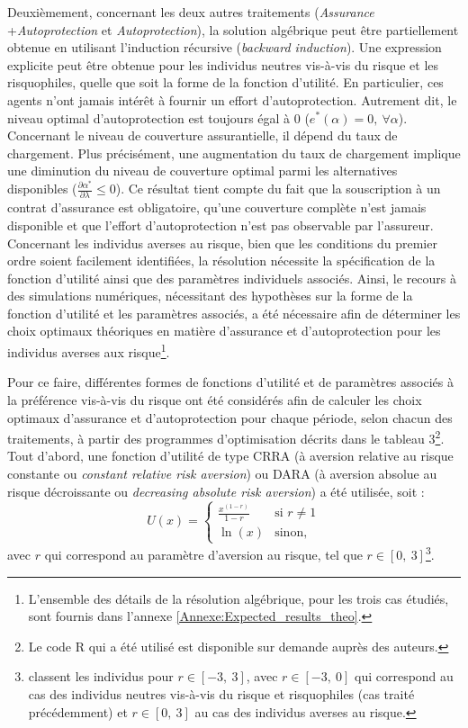 \begin{Article}
\begin{refsection}[Mouminoux]
Deuxièmement, concernant les deux autres traitements (\textit{Assurance} +\linebreak \textit{Autoprotection} et \textit{Autoprotection}), la solution algébrique peut être partiellement obtenue en utilisant l'induction récursive (\textit{backward induction}). Une expression explicite peut être obtenue pour les individus neutres vis-à-vis du risque et les risquophiles, quelle que soit la forme de la fonction d'utilité. En particulier, ces agents n'ont jamais intérêt à fournir un effort d'autoprotection. Autrement dit, le niveau optimal d'autoprotection est toujours égal à 0 ($e^*(\alpha)=0,\ \forall \alpha$). Concernant le niveau de couverture assurantielle, il dépend du taux de chargement. Plus précisément, une augmentation du taux de chargement implique une diminution du niveau de couverture optimal parmi les alternatives disponibles ($\frac{\partial \alpha^*}{\partial \lambda} \le 0$). Ce résultat tient compte du fait que la souscription à un contrat d'assurance est obligatoire, qu'une couverture complète n'est jamais disponible et que l'effort d'autoprotection n'est pas observable par l'assureur. Concernant les individus averses au risque, bien que les conditions du premier ordre soient facilement identifiées, la résolution nécessite la spécification de la fonction d'utilité ainsi que des paramètres individuels associés. Ainsi, le recours à des simulations numériques, nécessitant des hypothèses sur la forme de la fonction d'utilité et les paramètres associés, a été nécessaire afin de déterminer les choix optimaux théoriques en matière d'assurance et d'autoprotection pour les individus averses aux risque\footnote{L'ensemble des détails de la résolution algébrique, pour les trois cas étudiés, sont fournis dans l'annexe \ref{Annexe:Expected_results_theo}.}.

Pour ce faire, différentes formes de fonctions d'utilité et de paramètres associés à la préférence vis-à-vis du risque ont été considérés afin de calculer les choix optimaux d'assurance et d'autoprotection pour chaque période, selon chacun des traitements, à partir des programmes d'optimisation décrits dans le tableau 3\footnote{Le code R qui a été utilisé est disponible sur demande auprès des auteurs.}. Tout d'abord, une fonction d'utilité de type CRRA (à aversion relative au risque constante ou \textit{constant relative risk aversion}) ou DARA (à aversion absolue au risque décroissante ou \textit{decreasing absolute risk aversion}) a été utilisée, soit : 
\begin{equation}
U(x) = \left\{
    \begin{array}{ll}
        \frac{x^{(1-r)}}{1-r} & \mbox{si } r \neq 1 \\
        \ln(x) & \mbox{sinon,}
    \end{array}
\right.
\end{equation}
avec $r$ qui correspond au paramètre d'aversion au risque, tel que $r \in [0,~3]$\footnote{\textcite{hl02} classent les individus pour $r \in [-3,~3]$, avec $r \in [-3,~0]$ qui correspond au cas des individus neutres vis-à-vis du risque et risquophiles (cas traité précédemment) et $r \in [0,~3]$ au cas des individus averses au risque.}.


\end{refsection}
\end{Article}
